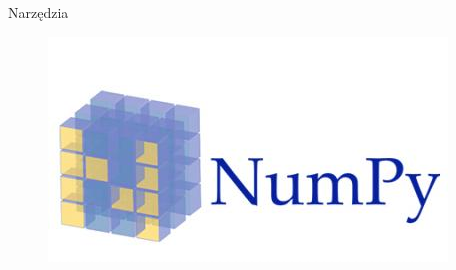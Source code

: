 \documentclass[xcolor=x11names,compress]{beamer}
\renewcommand{\(}{\begin{columns}}
\renewcommand{\)}{\end{columns}}
\newcommand{\<}[1]{\begin{column}{#1}}
\renewcommand{\>}{\end{column}}
\begin{document}
\begin{frame}{Narzędzia}
\begin{itemize}
{		    \begin{figure}
		    \centring
                    \begin{minipage}{.3\textwidth}
                    \includegraphics[width=\linewidth]{numpy.png}
                    \label{fig:test2}
                    \end{minipage}\hfill
 
		    \end{figure}

}
\end{itemize}
\end{frame}
\end{document}
